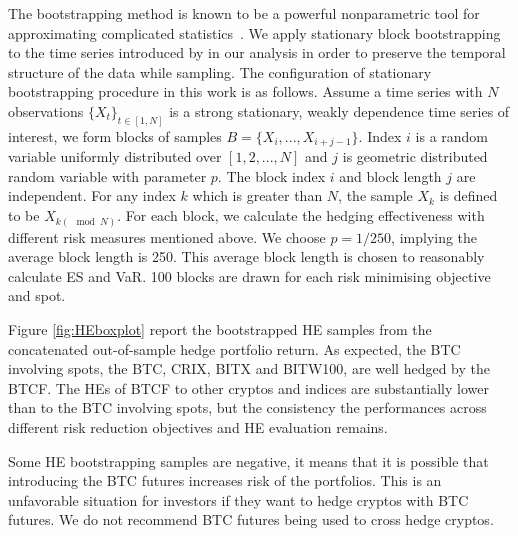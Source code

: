 The bootstrapping method is known to be a powerful nonparametric tool for approximating complicated statistics~\citep{efron1994introduction, davison1997bootstrap}.
We apply stationary block bootstrapping to the time series introduced by \cite{Politis1994} in our analysis in order to preserve the temporal structure of the data while sampling.
The configuration of stationary bootstrapping procedure in this work is as follows.
Assume a time series with $N$ observations $\{X_t\}_{t \in [1,N]}$ is a strong stationary, weakly dependence time series of interest,
we form blocks of samples $B = \{X_i, ..., X_{i+j-1}\}$.
Index $i$ is a random variable uniformly distributed over
$[1,2,...,N]$ and $j$ is geometric distributed random variable with parameter $p$.
The block index $i$ and block length $j$ are independent.
For any index $k$ which is greater than $N$, the sample $X_k$ is defined to be $X_{k(\mod N)}$.
For each block, we calculate the hedging effectiveness with different risk measures mentioned above.
We choose $p=1/250$, implying the average block length is 250.
This average block length is chosen to reasonably calculate ES and VaR.
100 blocks are drawn for each risk minimising objective and
spot. \medskip

Figure \ref{fig:HEboxplot} report the bootstrapped HE samples from the concatenated out-of-sample hedge portfolio return.
As expected, the BTC involving spots, the BTC, CRIX, BITX and BITW100, are well hedged by the BTCF.
The HEs of BTCF to other cryptos and indices are substantially lower than to the BTC involving spots, but the consistency the performances across different risk reduction objectives and HE evaluation remains.

Some HE bootstrapping samples are negative, it means that it is possible that introducing the BTC futures increases risk of the portfolios.
This is an unfavorable situation for investors if they want to hedge cryptos with BTC futures.
We do not recommend BTC futures being used to cross hedge cryptos.




